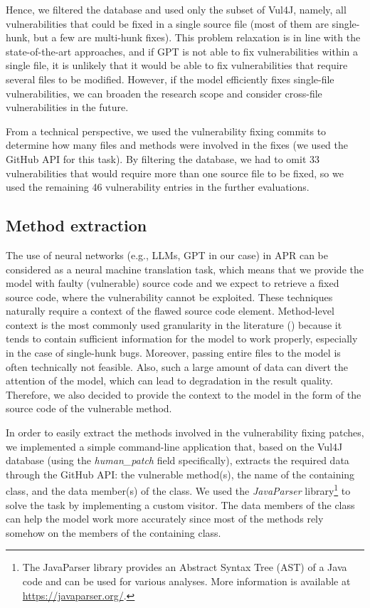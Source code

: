 Hence, we filtered the database and used only the subset of Vul4J, namely, all vulnerabilities that could be fixed in a single source file (most of them are single-hunk, but a few are multi-hunk fixes).
This problem relaxation is in line with the state-of-the-art approaches, and if GPT is not able to fix vulnerabilities within a single file, it is unlikely that it would be able to fix vulnerabilities that require several files to be modified.
However, if the model efficiently fixes single-file vulnerabilities, we can broaden the research scope and consider cross-file vulnerabilities in the future.

From a technical perspective, we used the vulnerability fixing commits to determine how many files and methods were involved in the fixes (we used the GitHub API for this task).
By filtering the database, we had to omit 33 vulnerabilities that would require more than one source file to be fixed, so we used the remaining 46 vulnerability entries in the further evaluations.


\subsection{Method extraction}

The use of neural networks (e.g., LLMs, GPT in our case) in APR can be considered as a neural machine translation task, which means that we provide the model with faulty (vulnerable) source code and we expect to retrieve a fixed source code, where the vulnerability cannot be exploited.
These techniques naturally require a context of the flawed source code element.
Method-level context is the most commonly used granularity in the literature (\cite{lutellier2020coconut, tufano2019empirical, yuan2022circle}) because it tends to contain sufficient information for the model to work properly, especially in the case of single-hunk bugs.
Moreover, passing entire files to the model is often technically not feasible.
Also, such a large amount of data can divert the attention of the model, which can lead to degradation in the result quality.
Therefore, we also decided to provide the context to the model in the form of the source code of the vulnerable method.

In order to easily extract the methods involved in the vulnerability fixing patches, we implemented a simple command-line application that, based on the Vul4J database (using the \textit{human\_patch} field specifically), extracts the required data through the GitHub API: the vulnerable method(s), the name of the containing class, and the data member(s) of the class.
We used the \textit{JavaParser} library\footnote{The JavaParser library provides an Abstract Syntax Tree (AST) of a Java code and can be used for various analyses. More information is available at \url{https://javaparser.org/}.} to solve the task by implementing a custom visitor.
The data members of the class can help the model work more accurately since most of the methods rely somehow on the members of the containing class.


